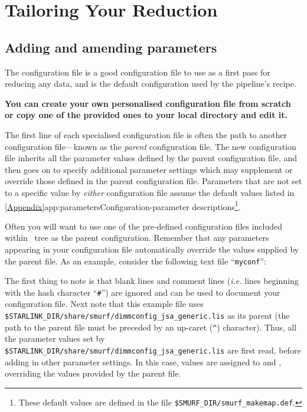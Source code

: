\chapter{Tailoring Your Reduction}
\label{sec:tweak}


\section{Adding and amending parameters}
The configuration file  is a good
configuration file to use as a first pass for reducing any data, and is
the default configuration used by the pipeline's 
recipe.

\textbf{You can create your own personalised configuration file from
scratch or copy one of the provided ones to your local directory and
edit it.}

The first line of each specialised configuration file is often the path
to another configuration file---known as the \emph{parent} configuration
file. The new configuration file inherits all the parameter values
defined by the parent configuration file, and then goes on to specify
additional parameter settings which may supplement or override those
defined in the parent configuration file. Parameters that are not set to
a specific value by \emph{either} configuration file assume the default
values listed in \cref{Appendix}{app:parameters}{Configuration-parameter
descriptions}\footnote{These default values are defined in the file
\texttt{\$SMURF\_DIR/smurf\_makemap.def}.}.

Often you will want to use one of the pre-defined configuration files
included within \starlink\ tree as the parent configuration. Remember
that any parameters appearing in your configuration file
automatically override the values supplied by the parent file. As an
example, consider the following text file ``\texttt{myconf}'':


The first thing to note is that blank lines and comment lines
(\emph{i.e.} lines beginning with the hash character ``\texttt{\#}'') are
ignored and can be used to document your configuration file. Next note
that this example file uses
\texttt{\$STARLINK\_DIR/share/smurf/dimmconfig\_jsa\_generic.lis} as its
parent (the path to the parent file must be preceded
by an up-caret (\texttt{\^}) character). Thus, all the parameter values
set by \texttt{\$STARLINK\_DIR/share/smurf/dimmconfig\_jsa\_generic.lis} are
first read, before adding in other parameter settings. In this case, values
are assigned to  and , overriding the
values provided by the parent file.

